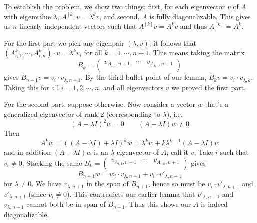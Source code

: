 \documentclass[11pt,a4paper]{article}
\newcommand{\<}{\langle}
\renewcommand{\>}{\rangle}
\begin{document}
\begin{enumerate}
    To establish the problem, we show two things: first, for each eigenvector $v$ of $A$ with eigenvalue $\lambda$, 
    $A^{[k]}v = \lambda^k v$, and second, $A$ is fully diagonalizable. 
    This gives us $n$ linearly independent vectors such that $A^{[k]}v = A^{k}v$ and thus $A^{[k]}=A^k$. 
    
    For the first part we pick any eigenpair $(\lambda, v)$; 
    it follows that $(A_{i, 1}^k, \cdots, A_{i, n}^k)\cdot v = \lambda^k v_i$ for all $k = 1, \cdots, n + 1$. 
    This means taking the matrix 
    \[
    B_k = 
    \begin{pmatrix}
    	v_{A_{i, 1}, n + 1} & \cdots & v_{A_{i, n}, n + 1}\\
    \end{pmatrix}
    \]
    gives $B_{n+1}v = v_i\cdot v_{\lambda, n + 1}$. 
    By the third bullet point of our lemma, $B_kv = v_i\cdot v_{\lambda, k}$.
    Taking this for all $i = 1, 2, \cdots, n$, and all eigenvectors $v$ we proved the first part. 
    
    For the second part, suppose otherwise. 
    Now consider a vector $w$ that's a generalized eigenvector of rank 2 (corresponding to $\lambda$), i.e. 
    \[
    (A - \lambda I)^2 w = 0
    \qquad 
    (A - \lambda I) w \neq 0
    \]
    Then 
    \[
    A^k w = ((A - \lambda I) + \lambda I)^k w 
    = \lambda ^k w + k\lambda^{k - 1}(A - \lambda I)w
    \]
    and in addition $(A - \lambda I)w$ is an $\lambda$-eigenvector of $A$, call it $v$. 
    Take $i$ such that $v_i\neq 0$. Stacking the same $B_k = 
    \begin{pmatrix}
    	v_{A_{i, 1}, n + 1} & \cdots & v_{A_{i, n}, n + 1}\\
    \end{pmatrix}$ gives 
    \[
    B_{n+1} w = w_i\cdot v_{\lambda, n + 1} + v_i\cdot v'_{\lambda, n + 1}
    \]
    for $\lambda \neq 0$. We have $v_{\lambda, n + 1}$ in the span of $B_{n+1}$, 
    hence so must be $v_i\cdot v'_{\lambda, n + 1}$ and $v'_{\lambda, n + 1}$ (since $v_i\neq 0$). 
    This contradicts our earlier lemma that $v'_{\lambda, n + 1}$ and $v_{\lambda, n + 1}$ cannot both be in span of $B_{n+1}$. 
    Thus this shows our $A$ is indeed diagonalizable. 
    	
\end{enumerate}
\end{document}
